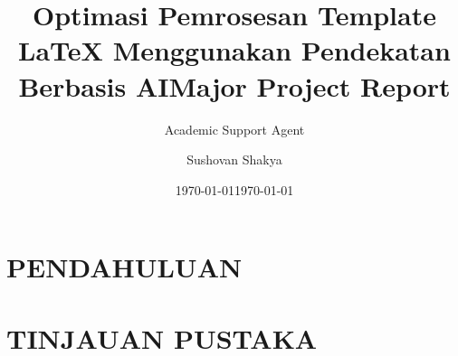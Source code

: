 \documentclass{article}
\title{Optimasi Pemrosesan Template LaTeX Menggunakan Pendekatan Berbasis AI}
\author{Academic Support Agent}
\date{\today}
\begin{document}
\maketitle

\begin{abstract}

\end{abstract}

\chapter{PENDAHULUAN}


\chapter{TINJAUAN PUSTAKA}


\usepackage{report}

\usepackage[acronym]{glossaries}
\usepackage{rotating}
\usepackage{float}
\usepackage{physics}
\usepackage{siunitx}
\usepackage{array}
\usepackage[justification=centering]{caption}
\captionsetup[figure]{font=small}
\usepackage{booktabs}
\usepackage[table,xcdraw]{xcolor}
\usepackage{chngcntr}
\usepackage[utf8]{inputenc}
\usepackage{listings}
\usepackage{subcaption}
\usepackage{tocloft}
\usepackage{indentfirst}
\usepackage{enumitem}


\setcounter{secnumdepth}{3} %
\setlength{\cfttabindent}{0pt} %
\setlength{\cftfigindent}{0pt} %


\title{Major Project Report}
\author{Sushovan Shakya}
\date{\today}
\end{document}
